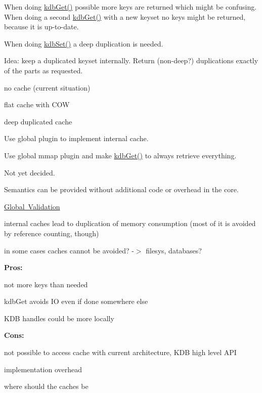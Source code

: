 When doing \mbox{\hyperlink{group__kdb_ga28e385fd9cb7ccfe0b2f1ed2f62453a1}{kdb\+Get()}} possible more keys are returned which might be confusing. When doing a second \mbox{\hyperlink{group__kdb_ga28e385fd9cb7ccfe0b2f1ed2f62453a1}{kdb\+Get()}} with a new keyset no keys might be returned, because it is up-\/to-\/date.

When doing \mbox{\hyperlink{group__kdb_ga11436b058408f83d303ca5e996832bcf}{kdb\+Set()}} a deep duplication is needed.

Idea\+: keep a duplicated keyset internally. Return (non-\/deep?) duplications exactly of the parts as requested.


\begin{DoxyItemize}
\item no cache (current situation)
\item flat cache with C\+OW
\item deep duplicated cache
\item Use global plugin to implement internal cache.
\item Use global mmap plugin and make \mbox{\hyperlink{group__kdb_ga28e385fd9cb7ccfe0b2f1ed2f62453a1}{kdb\+Get()}} to always retrieve everything.
\end{DoxyItemize}

Not yet decided.

Semantics can be provided without additional code or overhead in the core.


\begin{DoxyItemize}
\item \mbox{\hyperlink{doc_decisions_global_validation_md}{Global Validation}}
\end{DoxyItemize}

internal caches lead to duplication of memory consumption (most of it is avoided by reference counting, though)

in some cases caches cannot be avoided? -\/$>$ filesys, databases?

{\bfseries{Pros\+:}}


\begin{DoxyItemize}
\item not more keys than needed
\item kdb\+Get avoids IO even if done somewhere else
\item K\+DB handles could be more locally
\end{DoxyItemize}

{\bfseries{Cons\+:}}


\begin{DoxyItemize}
\item not possible to access cache with current architecture, K\+DB high level A\+PI
\item implementation overhead
\item where should the caches be 
\end{DoxyItemize}